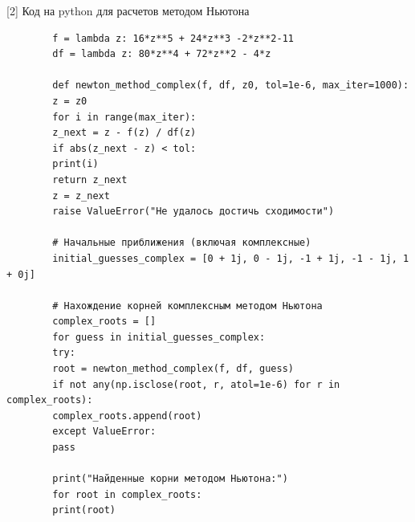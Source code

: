\documentclass{article}
\begin{document}
	[2] Код на python для расчетов методом Ньютона
	\begin{verbatim}
		f = lambda z: 16*z**5 + 24*z**3 -2*z**2-11
		df = lambda z: 80*z**4 + 72*z**2 - 4*z
		
		def newton_method_complex(f, df, z0, tol=1e-6, max_iter=1000):
		z = z0
		for i in range(max_iter):
		z_next = z - f(z) / df(z)
		if abs(z_next - z) < tol:
		print(i)
		return z_next
		z = z_next
		raise ValueError("Не удалось достичь сходимости")
		
		# Начальные приближения (включая комплексные)
		initial_guesses_complex = [0 + 1j, 0 - 1j, -1 + 1j, -1 - 1j, 1 + 0j]
		
		# Нахождение корней комплексным методом Ньютона
		complex_roots = []
		for guess in initial_guesses_complex:
		try:
		root = newton_method_complex(f, df, guess)
		if not any(np.isclose(root, r, atol=1e-6) for r in complex_roots):
		complex_roots.append(root)
		except ValueError:
		pass
		
		print("Найденные корни методом Ньютона:")
		for root in complex_roots:
		print(root)
	\end{verbatim}
	
	
	
\end{document}
